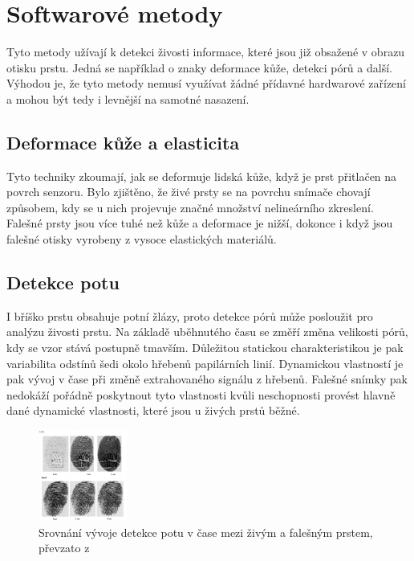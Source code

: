 \section{Softwarové metody}
Tyto metody užívají k detekci živosti informace, které jsou již obsažené v obrazu otisku prstu. Jedná se například o znaky deformace kůže, detekci pórů a další. Výhodou je, že tyto metody nemusí využívat žádné přídavné hardwarové zařízení a mohou být tedy i levnější na samotné nasazení.

\subsection{Deformace kůže a elasticita}
Tyto techniky zkoumají, jak se deformuje lidská kůže, když je prst přitlačen na povrch senzoru. Bylo zjištěno, že živé prsty se na povrchu snímače chovají způsobem, kdy se u nich projevuje značné množství nelineárního zkreslení. Falešné prsty jsou více tuhé než kůže a deformace je nižší, dokonce i když jsou falešné otisky vyrobeny z vysoce elastických materiálů.\cite{BiometricsEncyclopedia2009}

\subsection{Detekce potu}
I bříško prstu obsahuje potní žlázy, proto detekce pórů může posloužit pro analýzu živosti prstu. Na základě uběhnutého času se změří změna velikosti pórů, kdy se vzor stává postupně tmavším. Důležitou statickou charakteristikou je pak variabilita odstínů šedi okolo hřebenů papilárních linií. Dynamickou vlastností je pak vývoj v čase při změně extrahovaného signálu z hřebenů. Falešné snímky pak nedokáží pořádně poskytnout tyto vlastnosti kvůli neschopnosti provést hlavně dané dynamické vlastnosti, které jsou u živých prstů běžné.\cite{PoresResearch}

\begin{figure}[!htbp]
    \centering
    \includegraphics[width=110px]{obrazky-figures/pores.png}
    \caption{Srovnání vývoje detekce potu v čase mezi živým a falešným prstem, převzato z \cite{PoresResearch}}
\end{figure}




